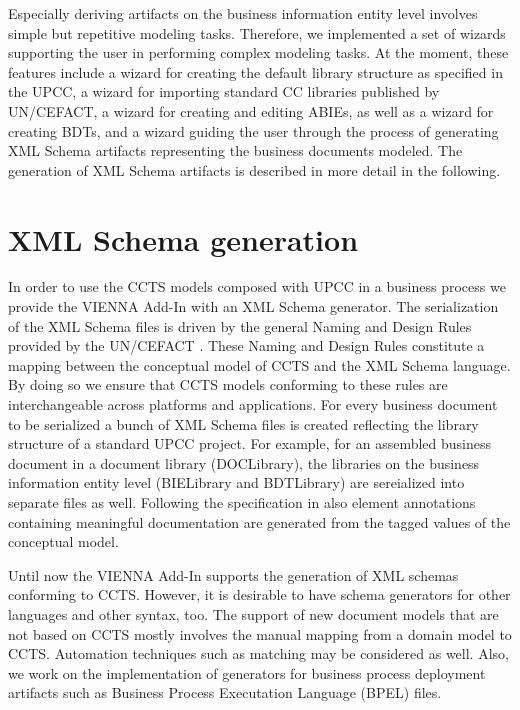 \documentclass{acm_proc_article-sp}
\begin{document}
Especially deriving artifacts on the business information entity level involves simple but repetitive modeling tasks. Therefore, we implemented a set of wizards supporting the user in performing complex modeling tasks. At the moment, these features include a wizard for creating the default library structure as specified in the UPCC, a wizard for importing standard CC libraries published by UN/CEFACT, a wizard for creating and editing ABIEs, as well as a wizard for creating BDTs, and a wizard guiding the user through the process of generating XML Schema artifacts representing the business documents modeled. The generation of XML Schema artifacts is described in more detail in the following. 

\section{XML Schema generation}
In order to use the CCTS models composed with UPCC in a business process we provide the VIENNA Add-In with an XML Schema generator. The serialization of the XML Schema files is driven by the general Naming and Design Rules provided by the UN/CEFACT \cite{CEFACT:NDR}. These Naming and Design Rules constitute a mapping between the conceptual model of CCTS and the XML Schema language. By doing so we ensure that CCTS models conforming to these rules are interchangeable across platforms and applications. For every business document to be serialized a bunch of XML Schema files is created reflecting the library structure of a standard UPCC project. For example, for an assembled business document in a document library (DOCLibrary), the libraries on the business information entity level (BIELibrary and BDTLibrary) are sereialized into separate files as well. Following the specification in \cite{CEFACT:NDR} also element annotations containing meaningful documentation are generated from the tagged values of the conceptual model. 

Until now the VIENNA Add-In supports the generation of XML schemas conforming to CCTS. However, it is desirable to have schema generators for other languages and other syntax, too. The support of new document models that are not based on CCTS mostly involves the manual mapping from a domain model to CCTS. Automation techniques such as matching may be considered as well. Also, we work on the implementation of generators for business process deployment artifacts such as Business Process Executation Language (BPEL) files.


\end{document}
